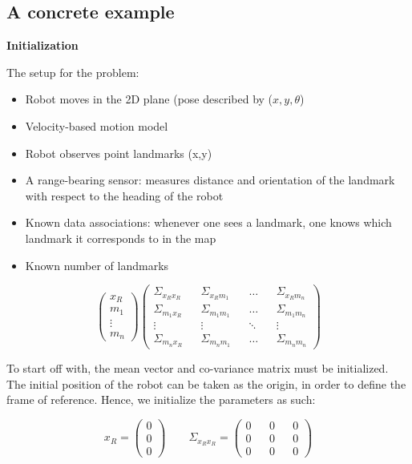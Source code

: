 \documentclass[a4paper]{article}
\begin{document}
\subsection{A concrete example}

\textbf{Initialization}

The setup for the problem:

\begin{itemize}
    \item Robot moves in the 2D plane (pose described by ($x, y, \theta$)
    \item Velocity-based motion model
    \item Robot observes point landmarks (x,y)
    \item A range-bearing sensor: measures distance and orientation of the landmark with respect to the heading of the robot
    \item Known data associations: whenever one sees a landmark, one knows which landmark it corresponds to in the map
    \item Known number of landmarks
\end{itemize}

\begin{equation*}
    \begin{pmatrix}
    x_R \\ m_1 \\ \vdots \\ m_n
    \end{pmatrix}
    \begin{pmatrix}
    \Sigma_{x_R x_R} && \Sigma_{x_R m_1} && \hdots && \Sigma_{x_R m_n}
    \\
    \Sigma_{m_1 x_R} && \Sigma_{m_1 m_1} && \hdots && \Sigma_{m_1 m_n}
    \\
    \vdots && \vdots && \ddots && \vdots
    \\
    \Sigma_{m_n x_R} && \Sigma_{m_n m_1} && \hdots && \Sigma_{m_n m_n}
    \end{pmatrix}
\end{equation*}

To start off with, the mean vector and co-variance matrix must be initialized. The initial position of the robot can be taken as the origin, in order to define the frame of reference. Hence, we initialize the parameters as such:

\begin{equation*}
    x_R = 
    \begin{pmatrix}
    0 \\ 0 \\ 0
    \end{pmatrix}
    \qquad
    \Sigma_{x_R x_R} = 
    \begin{pmatrix}
    0 && 0 && 0 \\ 0 && 0 && 0 \\ 0 && 0 && 0
    \end{pmatrix}
\end{equation*}
\end{document}
